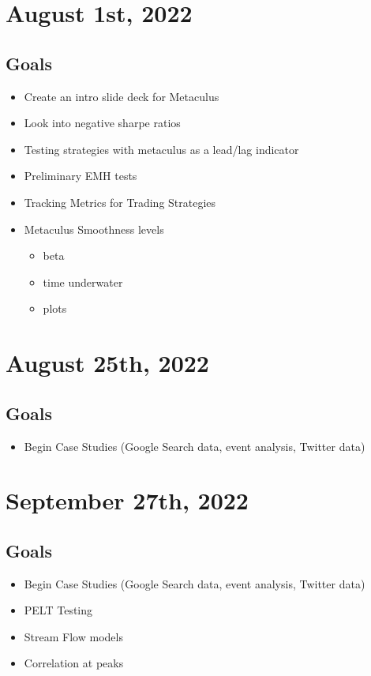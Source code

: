 \documentclass{article}
\begin{document}
\section{August 1st, 2022}
\subsection*{Goals}
\begin{itemize}
    \item Create an intro slide deck for Metaculus
    \item Look into negative sharpe ratios
    \item Testing strategies with metaculus as a lead/lag indicator
    \item Preliminary EMH tests
    \item Tracking Metrics for Trading Strategies
    \item Metaculus Smoothness levels
    \begin{itemize}
        \item beta
        \item time underwater
        \item plots
    \end{itemize}

\end{itemize}

\section{August 25th, 2022}
\subsection*{Goals}
\begin{itemize}
    \item Begin Case Studies (Google Search data, event analysis, Twitter data)
\end{itemize}

\section{September 27th, 2022}
\subsection*{Goals}
\begin{itemize}
    \item Begin Case Studies (Google Search data, event analysis, Twitter data)
    \item PELT Testing
    \item Stream Flow models
    \item Correlation at peaks
\end{itemize}
\end{document}
